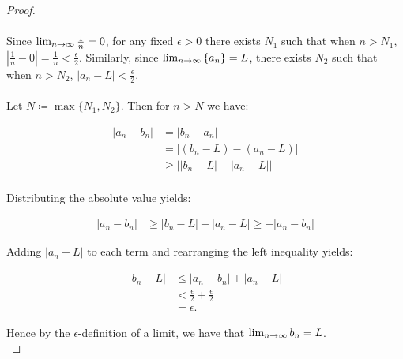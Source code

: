     \begin{proof}\ \\\\
        Since ${\lim_{n \rightarrow \infty}{\frac{1}{n}}} = 0$, for any fixed 
        $\epsilon > 0$ there exists $N_1$ such that when $n > N_1$,
        $|\frac{1}{n} - 0| = \frac{1}{n} < \frac{\epsilon}{2}$. Similarly,
        since ${\lim_{n \rightarrow \infty}{\{a_n\}}} = L$, there exists $N_2$
        such that when $n > N_2$, $|a_n - L| < \frac{\epsilon}{2}$. \\\\
        
        Let $N \coloneqq \max{\{N_1, N_2\}}$. Then for $n > N$ we have:


        \begin{align*}
            |a_n - b_n| &= |b_n - a_n| \\
                        &= |(b_n - L) - (a_n - L)| \\
                        &\ge \bigl| |b_n - L| - |a_n - L|\bigl| \\
        \end{align*}

        Distributing the absolute value yields:


        \begin{align*}
            |a_n - b_n| &\ge |b_n - L| - |a_n - L| \ge -|a_n - b_n|
        \end{align*}

        Adding $|a_n - L|$ to each term and rearranging the left inequality 
        yields:

        \begin{align*}
            |b_n - L| &\le |a_n - b_n| + |a_n - L| \\
                      &< \frac{\epsilon}{2} + \frac{\epsilon}{2} \\
                      &= \epsilon.
        \end{align*}

        Hence by the $\epsilon$-definition of a limit, we have that 
        ${\lim_{n \rightarrow \infty}{b_n}} = L$.
        \\
    \end{proof}